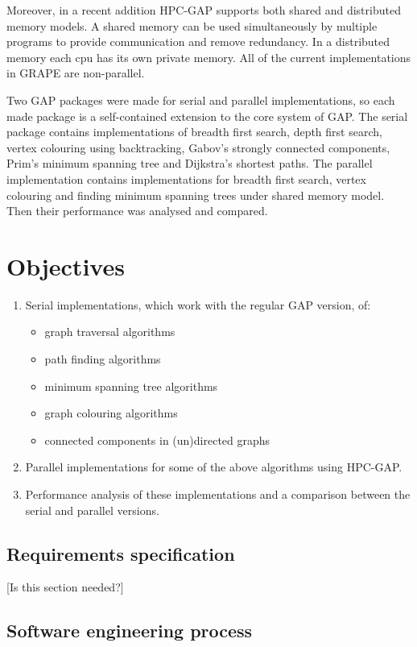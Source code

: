 \documentclass{report}
\theoremstyle{plain}
\theoremstyle{definition}
\theoremstyle{remark}
\begin{document}
Moreover, in a recent addition HPC-GAP supports both shared and distributed memory models. A shared memory can be used simultaneously by multiple programs to provide communication and remove redundancy. In a distributed memory each cpu has its own private memory. All of the current implementations in GRAPE are non-parallel.

Two GAP packages were made for serial and parallel implementations, so each made package is a self-contained extension to the core system of GAP. The serial package contains implementations of breadth first search, depth first search, vertex colouring using backtracking, Gabov's strongly connected components, Prim's minimum spanning tree and Dijkstra's shortest paths. The parallel implementation contains implementations for breadth first search, vertex colouring and finding minimum spanning trees under shared memory model. Then their performance was analysed and compared.

\chapter{Objectives}
\begin{enumerate}
  \item Serial implementations, which work with the regular GAP version, of:
  \begin{itemize}
    \item graph traversal algorithms
    \item path finding algorithms
    \item minimum spanning tree algorithms
    \item graph colouring algorithms
    	\item connected components in (un)directed graphs
  \end{itemize}
  \item Parallel implementations for some of the above algorithms using HPC-GAP.
  \item Performance analysis of these implementations and a comparison between the serial and parallel versions.
\end{enumerate}

\section{Requirements specification}

[Is this section needed?]

\section{Software engineering process}
\end{document}
